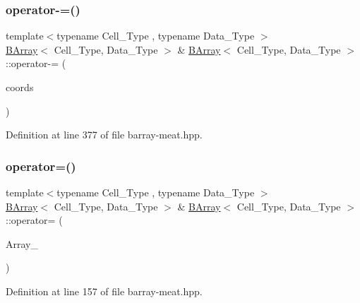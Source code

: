 \subsubsection{\texorpdfstring{operator-\/=()}{operator-=()}}
{\footnotesize\ttfamily template$<$typename Cell\+\_\+\+Type , typename Data\+\_\+\+Type $>$ \\
\hyperlink{class_b_array}{B\+Array}$<$ Cell\+\_\+\+Type, Data\+\_\+\+Type $>$ \& \hyperlink{class_b_array}{B\+Array}$<$ Cell\+\_\+\+Type, Data\+\_\+\+Type $>$\+::operator-\/= (\begin{DoxyParamCaption}\item[{const std\+::pair$<$ \hyperlink{typedefs_8hpp_a91ad9478d81a7aaf2593e8d9c3d06a14}{uint}, \hyperlink{typedefs_8hpp_a91ad9478d81a7aaf2593e8d9c3d06a14}{uint} $>$ \&}]{coords }\end{DoxyParamCaption})\hspace{0.3cm}{\ttfamily [inline]}}



Definition at line 377 of file barray-\/meat.\+hpp.

\mbox{\label{class_b_array_aa6dba52877c92fa8eafc35faa5f7f304}} 
\subsubsection{\texorpdfstring{operator=()}{operator=()}}
{\footnotesize\ttfamily template$<$typename Cell\+\_\+\+Type , typename Data\+\_\+\+Type $>$ \\
\hyperlink{class_b_array}{B\+Array}$<$ Cell\+\_\+\+Type, Data\+\_\+\+Type $>$ \& \hyperlink{class_b_array}{B\+Array}$<$ Cell\+\_\+\+Type, Data\+\_\+\+Type $>$\+::operator= (\begin{DoxyParamCaption}\item[{const \hyperlink{class_b_array}{B\+Array}$<$ Cell\+\_\+\+Type, Data\+\_\+\+Type $>$ \&}]{Array\+\_\+ }\end{DoxyParamCaption})\hspace{0.3cm}{\ttfamily [inline]}}



Definition at line 157 of file barray-\/meat.\+hpp.

\mbox{\label{class_b_array_a1e6e18162202b06e19f214097eb993bf}} 

